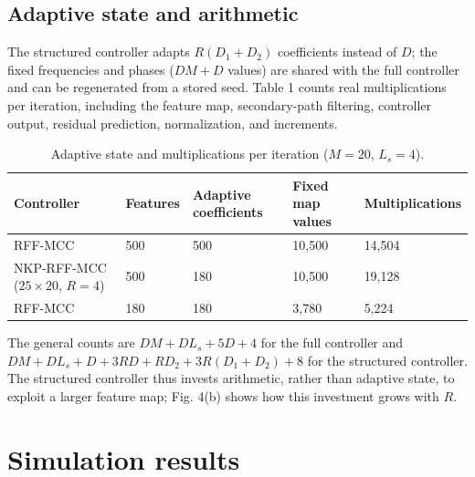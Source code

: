 \documentclass[preprint,12pt]{elsarticle}
\begin{document}
\subsection{Adaptive state and arithmetic}
The structured controller adapts $R(D_1 + D_2)$ coefficients instead of $D$; the fixed frequencies and phases ($DM + D$ values) are shared with the full controller and can be regenerated from a stored seed. Table 1 counts real multiplications per iteration, including the feature map, secondary-path filtering, controller output, residual prediction, normalization, and increments.
\begin{table}[htbp]
\centering
\small
\caption{Adaptive state and multiplications per iteration ($M = 20$, $L_s = 4$).}
\begin{tabularx}{\linewidth}{@{}lXXXX@{}}
\toprule
Controller & Features & Adaptive coefficients & Fixed map values & Multiplications \\
\midrule
RFF-MCC & 500 & 500 & 10,500 & 14,504 \\
NKP-RFF-MCC ($25 \times 20$, $R = 4$) & 500 & 180 & 10,500 & 19,128 \\
RFF-MCC & 180 & 180 & 3,780 & 5,224 \\
\bottomrule
\end{tabularx}
\end{table}
The general counts are $DM + DL_s + 5D + 4$ for the full controller and $DM + DL_s + D + 3RD + RD_2 + 3R(D_1 + D_2) + 8$ for the structured controller. The structured controller thus invests arithmetic, rather than adaptive state, to exploit a larger feature map; Fig. 4(b) shows how this investment grows with $R$.
\section{Simulation results}
\end{document}
